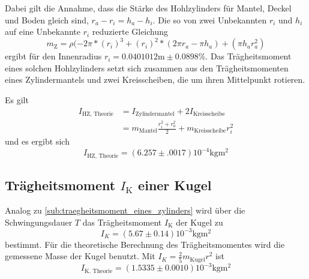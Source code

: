 Dabei gilt die Annahme, dass die Stärke des Hohlzylinders für Mantel, Deckel und Boden gleich sind, $r_a-r_i=h_a-h_i$. 
Die so von zwei Unbekannten $r_i$ und $h_i$ auf eine Unbekannte $r_i$ reduzierte Gleichung
\begin{equation}
	m_\text{Z}=\rho(-2\pi*(r_i)^3+(r_i)^2*(2\pi r_a-\pi h_a)+(\pi h_a r_a^2)
\end{equation}
ergibt für den Innenradius $r_i = 0.0401012\si{\meter}\pm0.0898\%$.
Das Trägheitsmoment eines solchen Hohlzylinders setzt sich zusammen aus den Trägheitsmomenten eines Zylindermantels und zwei Kreisscheiben, die um ihren Mittelpunkt rotieren. \cite{kuchen}

Es gilt
\begin{align*}
	I_{\text{HZ, Theorie}}&=I_{\text{Zylindermantel}}+2I_{\text{Kreisscheibe}}\\
	&=m_\text{Mantel} \frac{r_i^2+r_a^2}{2}+m_\text{Kreisscheibe} r_i^2
\end{align*}
und es ergibt sich
\begin{equation}
	I_{\text{HZ, Theorie}}= (6.257\pm.0017)10^{-4} \si{\kilo\gram\meter\squared}
\end{equation}
\subsection{Trägheitsmoment $I_\text{K}$ einer Kugel}

\noindent Analog zu \ref{sub:traegheitsmoment_eines_zylinders} wird über die Schwingungsdauer $T$ das Trägheitsmoment $I_\text{K}$ der Kugel zu
\begin{equation}
	\label{wert:Kugel}
	I_K=(5.67\pm0.14)10^{-3} \si{\kilo\gram\meter\squared}
\end{equation}
bestimmt.
Für die theoretische Berechnung des Trägheitsmomentes wird die gemessene Masse der Kugel benutzt.
Mit $I_K = \frac{2}{5} m_{\text{Kugel}} r^2$ \cite{kuchen} ist 
\begin{equation}
	\label{wert:Kugel}
	I_\text{K, Theorie}= (1.5335\pm0.0010)10^{-3} \si{\kilo\gram\meter\squared}
\end{equation}
